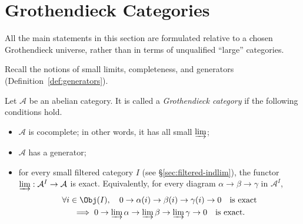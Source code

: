 
\section{Grothendieck Categories}\label{sec:Grothendieck-cat}
\hypertarget{o014.aljabr2.chapter2.grothendieck-categories}{ }

All the main statements in this section are formulated relative to a chosen
Grothendieck universe, rather than in terms of unqualified ``large''
categories.

Recall the notions of small limits, completeness, and generators
(Definition~\ref{def:generators}).

\begin{definition}\label{def:Grothendieck-cat}
	Let $\mathcal{A}$ be an abelian category. It is called a
	\emph{Grothendieck category} if the following conditions hold.
	\begin{itemize}
		\item $\mathcal{A}$ is cocomplete; in other words, it has all small
		$\varinjlim$;
		\item $\mathcal{A}$ has a generator;
		\item for every small filtered category $I$ (see
		\S\ref{sec:filtered-indlim}), the functor
		$\varinjlim:\mathcal{A}^I\to\mathcal{A}$ is exact. Equivalently, for
		every diagram $\alpha\to\beta\to\gamma$ in $\mathcal{A}^I$,
		\begin{multline*}
			\forall i\in\Obj(I),\quad
			0\to\alpha(i)\to\beta(i)\to\gamma(i)\to0
			\quad\text{is exact} \\
			\implies 0\to\varinjlim\alpha\to\varinjlim\beta
			\to\varinjlim\gamma\to0\quad\text{is exact}.
		\end{multline*}
	\end{itemize}
\end{definition}

